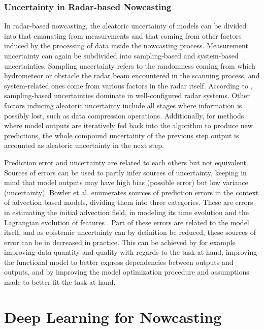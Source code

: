 \subsubsection*{Uncertainty in Radar-based Nowcasting}

In radar-based nowcasting, the aleatoric uncertainty of models can be divided into that emanating from measurements and that coming from other factors induced by the processing of data inside the nowcasting process. Measurement uncertainty can again be subdivided into sampling-based and system-based uncertainties. Sampling uncertainty refers to the randomness coming from which hydrometeor or obstacle the radar beam encountered in the scanning process, and system-related ones come from various factors in the radar itself. According to \citet{cao_measurement_2016}, sampling-based uncertainties dominate in well-configured radar systems. Other factors inducing aleatoric uncertainty include all stages where information is possibly lost, such as data compression operations. Additionally, for methods where model outputs are iteratively fed back into the algorithm to produce new predictions, the whole compound uncertainty of the previous step output is accounted as aleatoric uncertainty in the next step. 


Prediction error and uncertainty are related to each others but not equivalent. Sources of errors can be used to partly infer sources of uncertainty, keeping in mind that model outputs may have high bias (possible error) but low variance (uncertainty). Bowler et al. enumerates sources of prediction errors in the context of advection based models, dividing them into three categories. These are errors in estimating the initial advection field, in modeling its time evolution and the Lagrangian evolution of features \cite{bowler_steps_2006}. Part of these errors are related to the model itself, and as epistemic uncertainty can by definition be reduced, these sources of error can be in decreased in practice. This can be achieved by for example improving data quantity and quality with regards to the task at hand, improving the functional model to better express dependencies between outputs and outputs, and by improving the model optimization procedure and assumptions made to better fit the task at hand.%



\section{Deep Learning for Nowcasting}
\label{section:dl_for_nc}

